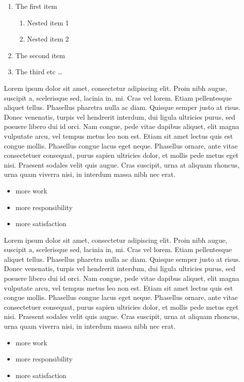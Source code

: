 \documentclass[12pt,a4paper,oneside]{book}
\begin{document}
  \begin{enumerate}
\item The first item
\begin{enumerate}
\item Nested item 1
\item Nested item 2
\end{enumerate}
\item The second item
\item The third etc \ldots
\end{enumerate}
  
  Lorem ipsum dolor sit amet, consectetur adipiscing elit. Proin nibh augue, suscipit a, scelerisque sed, lacinia in, mi. Cras vel lorem. Etiam pellentesque aliquet tellus. Phasellus pharetra nulla ac diam. Quisque semper justo at risus. Donec venenatis, turpis vel hendrerit interdum, dui ligula ultricies purus, sed posuere libero dui id orci. Nam congue, pede vitae dapibus aliquet, elit magna vulputate arcu, vel tempus metus leo non est. Etiam sit amet lectus quis est congue mollis. Phasellus congue lacus eget neque. Phasellus ornare, ante vitae consectetuer consequat, purus sapien ultricies dolor, et mollis pede metus eget nisi. Praesent sodales velit quis augue. Cras suscipit, urna at aliquam rhoncus, urna quam viverra nisi, in interdum massa nibh nec erat.
  
  \begin{itemize}
\item more work
\item more responsibility
\item more satisfaction
\end{itemize}
  
  Lorem ipsum dolor sit amet, consectetur adipiscing elit. Proin nibh augue, suscipit a, scelerisque sed, lacinia in, mi. Cras vel lorem. Etiam pellentesque aliquet tellus. Phasellus pharetra nulla ac diam. Quisque semper justo at risus. Donec venenatis, turpis vel hendrerit interdum, dui ligula ultricies purus, sed posuere libero dui id orci. Nam congue, pede vitae dapibus aliquet, elit magna vulputate arcu, vel tempus metus leo non est. Etiam sit amet lectus quis est congue mollis. Phasellus congue lacus eget neque. Phasellus ornare, ante vitae consectetuer consequat, purus sapien ultricies dolor, et mollis pede metus eget nisi. Praesent sodales velit quis augue. Cras suscipit, urna at aliquam rhoncus, urna quam viverra nisi, in interdum massa nibh nec erat.
  
  \begin{itemize}[noitemsep]
\item more work
\item more responsibility
\item more satisfaction
\end{itemize}
\end{document}
